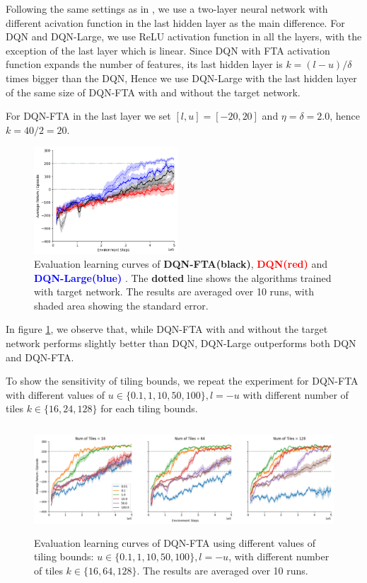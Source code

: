 \documentclass{article}
\begin{document}
Following the same settings as in \cite{pan2019fuzzy}, we use a two-layer neural network with different acivation function in the last hidden layer as the main difference. For DQN and DQN-Large, we use ReLU activation function in all the layers, with the exception of the last layer which is linear.
Since DQN with FTA activation function expands the number of features, its last hidden layer is $k = (l-u)/\delta$ times bigger than the DQN, Hence we use DQN-Large with the last hidden layer of the same size of DQN-FTA with and without the target network.

For DQN-FTA in the last layer we set $[l, u] = [-20, 20]$ and $\eta = \delta = 2.0$, hence $k = 40/2 = 20$.


\begin{figure}[h]
    \centering
    \includegraphics[height=4cm]{ftavrelu.png}
    \caption{Evaluation learning curves of {\bf DQN-FTA(black)}, {\textcolor{red} {\bf DQN(red)}} and {\textcolor{blue} {\bf DQN-Large(blue)} }. The {\bf dotted} line shows the algorithms trained with target network. The results are averaged over 10 runs, with shaded area showing the standard error.}
    \label{fig:ftavrelu}
\end{figure}



In figure \ref{fig:ftavrelu}, we observe that, while DQN-FTA with and without the target network performs slightly better than DQN, DQN-Large outperforms both DQN and DQN-FTA.

To show the sensitivity of tiling bounds, we repeat the experiment for DQN-FTA with different values of $u \in \{0.1,1,10,50,100\}, l = -u$ with different number of tiles $k \in \{16, 24, 128\}$ for each tiling bounds.

\begin{figure}[h]
    \centering
    \includegraphics[height=4cm]{sweepfta.png}
    \caption{Evaluation learning curves of DQN-FTA using different values of tiling bounds: $u \in \{0.1, 1, 10, 50, 100\}, l = -u$, with different number of tiles $k \in \{16, 64, 128\}$. The results are averaged over 10 runs.}
    \label{fig:sweepfta}
\end{figure}
\end{document}
